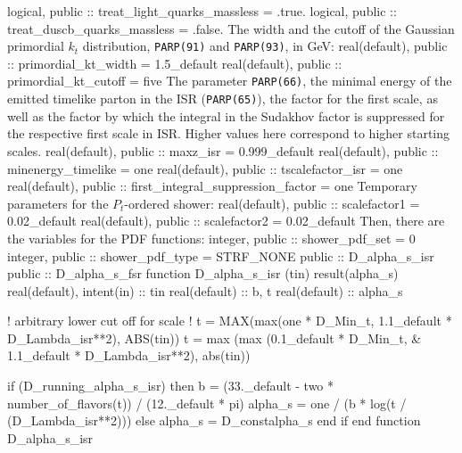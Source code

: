  logical, public :: treat_light_quarks_massless = .true.
  logical, public :: treat_duscb_quarks_massless = .false.
\eatline
\eatline
\nwendcode{}\nwdocspar
The width and the cutoff of the Gaussian primordial $k_t$
distribution, {\tt{}PARP(91)} and {\tt{}PARP(93)}, in GeV:
\nwenddocs{}\plusendmoddef
  real(default), public :: primordial_kt_width = 1.5_default
  real(default), public :: primordial_kt_cutoff = five
\eatline
\eatline
\nwendcode{}\nwdocspar
The parameter {\tt{}PARP(66)}, the minimal energy of the emitted timelike
parton in the ISR ({\tt{}PARP(65)}), the factor for the first scale, as
well as the factor by which the integral in the Sudakhov factor is
suppressed for the respective first scale in ISR. Higher values
here correspond  to higher starting scales.
\nwenddocs{}\plusendmoddef
  real(default), public :: maxz_isr = 0.999_default
  real(default), public :: minenergy_timelike = one
  real(default), public :: tscalefactor_isr = one
  real(default), public :: first_integral_suppression_factor = one
\eatline
\eatline
\nwendcode{}\nwdocspar
Temporary parameters for the $P_t$-ordered shower:
\nwenddocs{}\plusendmoddef
  real(default), public :: scalefactor1 = 0.02_default
  real(default), public :: scalefactor2 = 0.02_default
\eatline
\nwendcode{}\nwdocspar
Then, there are the variables for the PDF functions:
\nwenddocs{}\plusendmoddef
  integer, public :: shower_pdf_set = 0
  integer, public :: shower_pdf_type = STRF_NONE
\eatline
\nwendcode{}\nwdocspar
\nwenddocs{}\endmoddef
  public :: D_alpha_s_isr
  public :: D_alpha_s_fsr
\nwendcode{}\endmoddef
  function D_alpha_s_isr (tin) result(alpha_s)
    real(default), intent(in) :: tin
    real(default) :: b, t
    real(default) :: alpha_s

!    arbitrary lower cut off for scale
!    t = MAX(max(one * D_Min_t, 1.1_default * D_Lambda_isr**2), ABS(tin))
    t = max (max (0.1_default * D_Min_t, &
         1.1_default * D_Lambda_isr**2), abs(tin))

    if (D_running_alpha_s_isr) then
       b = (33._default - two * number_of_flavors(t)) / (12._default * pi)
       alpha_s = one / (b * log(t / (D_Lambda_isr**2)))
    else
       alpha_s = D_constalpha_s
    end if
  end function D_alpha_s_isr

